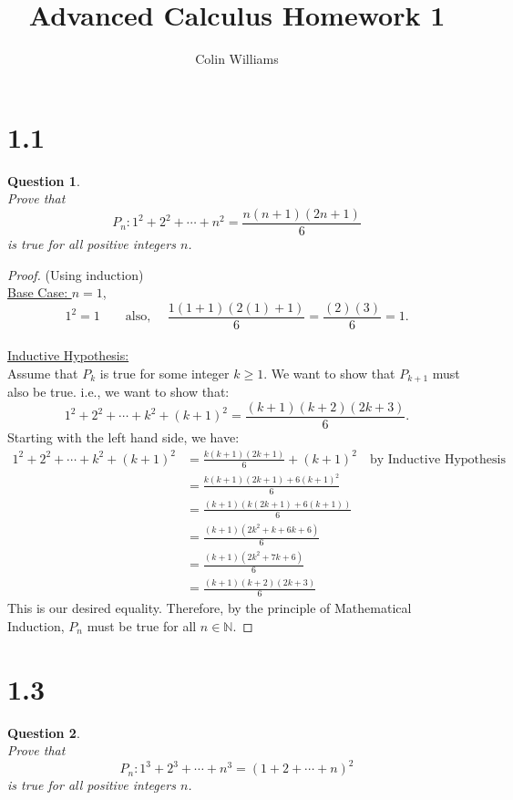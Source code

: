 \documentclass[10pt,a4paper]{article}
\title{Advanced Calculus Homework 1}
\author{Colin Williams}
\newtheorem*{question*}{Question}
\begin{document}
\maketitle
\section*{1.1}
\begin{question*}{$ $}
\\Prove that 
\[P_n: 1^2 + 2^2 + \cdots + n^2 = \frac{n(n+1)(2n+1)}{6}\]
is true for all positive integers $n$.
\end{question*}

\begin{proof}{(Using induction)}
\\\underline{Base Case: $n = 1$,}
\[1^2 = 1 \quad \quad \text{also, } \quad \frac{1(1+1)(2(1)+1)}{6} = \frac{(2)(3)}{6} = 1.\]
\\\underline{Inductive Hypothesis:}
\\Assume that $P_k$ is true for some integer $k \geq 1$. We want to show that $P_{k+1}$ must also be true. i.e., we want to show that:
\[1^2 + 2^2 + \cdots + k^2 + (k+1)^2 = \frac{(k+1)(k+2)(2k+3)}{6}.\]
Starting with the left hand side, we have:
\begin{align*}
1^2 + 2^2 + \cdots + k^2 + (k+1)^2 &= \frac{k(k+1)(2k+1)}{6} + (k+1)^2 \quad \text{by Inductive Hypothesis}\\
&= \frac{k(k+1)(2k+1) + 6(k+1)^2}{6}\\
&= \frac{(k+1)(k(2k+1) + 6(k+1))}{6}\\
&= \frac{(k+1)(2k^2 + k + 6k + 6)}{6}\\
&= \frac{(k+1)(2k^2 + 7k + 6)}{6}\\
&= \frac{(k+1)(k+2)(2k+3)}{6}
\end{align*}
This is our desired equality. Therefore, by the principle of Mathematical Induction, $P_n$ must be true for all $n \in \mathbb{N}$.
\end{proof}

\section*{1.3}
\begin{question*}{$ $}
\\Prove that 
\[P_n: 1^3 + 2^3 + \cdots + n^3 = (1 + 2 + \cdots + n)^2\]
is true for all positive integers $n$.
\end{question*}
\end{document}
